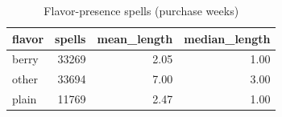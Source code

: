 \begin{table}
\caption{Flavor-presence spells (purchase weeks)}
\begin{tabular}{lrrr}
\toprule
flavor & spells & mean\_length & median\_length \\
\midrule
berry & 33269 & 2.05 & 1.00 \\
other & 33694 & 7.00 & 3.00 \\
plain & 11769 & 2.47 & 1.00 \\
\bottomrule
\end{tabular}
\end{table}
